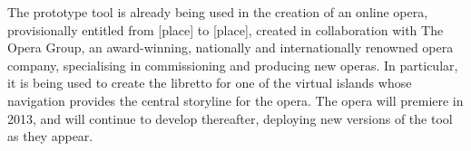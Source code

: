 \begin{draft}
The prototype tool is already being used in the creation of an online opera, provisionally entitled from [place] to [place], created in collaboration with The Opera Group, an award-winning, nationally and internationally renowned opera company, specialising in commissioning and producing new operas. In particular, it is being used to create the libretto for one of the virtual islands whose navigation provides the central storyline for the opera. The opera will premiere in 2013, and will continue to develop thereafter, deploying new versions of the tool as they appear.
\end{draft}






\stopcontents[chapters]
